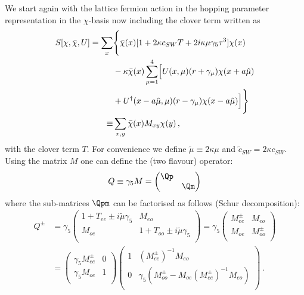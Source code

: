 We start again with the lattice fermion action in the hopping
parameter representation in the $\chi$-basis now including the clover
term written as
\begin{equation}
  \label{eq:eosw0}
    \begin{split}
    S[\chi,\bar\chi,U] = \sum_x & \Biggl\{ \bar\chi(x)[1+2\kappa
    c_{SW}T + 2i \kappa\mu\gamma_5\tau^3]\chi(x)  \Bigr. \\
    & -\kappa\bar\chi(x)\sum_{\mu = 1}^4\Bigl[ U(x,\mu)(r+\gamma_\mu)\chi(x+a\hat\mu)\bigr. \\
    & +\Bigl. \bigl. U^\dagger(x-a\hat\mu,\mu)(r-\gamma_\mu)\chi(x-a\hat\mu)\Bigr]
    \Biggr\} \\
    \equiv &\sum_{x,y}\bar\chi(x) M_{xy}\chi(y)\, ,
  \end{split}
\end{equation}
with the clover term $T$. For convenience we define
$\tilde\mu\equiv2\kappa\mu$ and $\tilde c_{SW} = 2\kappa
c_{SW}$. Using the matrix $M$ one can define the 
(two flavour) operator:
\begin{equation}
  \label{eq:eosw1}
  Q\equiv \gamma_5 M = \begin{pmatrix}
    \Qp & \\\
    & \Qm \\
  \end{pmatrix}
\end{equation}
where the sub-matrices $\Qpm$ can be factorised as follows (Schur
decomposition): 
\begin{equation}
  \label{eq:eosw2}
  \begin{split}
    Q^\pm &= \gamma_5\begin{pmatrix}
      1 + T_{ee} \pm i\tilde\mu\gamma_5 & M_{eo} \\
      M_{oe}    & 1 + T_{oo} \pm i\tilde\mu\gamma_5 \\
    \end{pmatrix} =
    \gamma_5\begin{pmatrix}
      M_{ee}^\pm & M_{eo} \\
      M_{oe}    & M_{oo}^\pm \\
    \end{pmatrix} \\
    & =
    \begin{pmatrix}
      \gamma_5M_{ee}^\pm & 0 \\
      \gamma_5M_{oe}  & 1 \\
    \end{pmatrix}
    \begin{pmatrix}
      1       & (M_{ee}^\pm)^{-1}M_{eo}\\
      0       & \gamma_5(M_{oo}^\pm-M_{oe}(M_{ee}^\pm)^{-1}M_{eo})\\
    \end{pmatrix}\, .
\end{split}
\end{equation}

